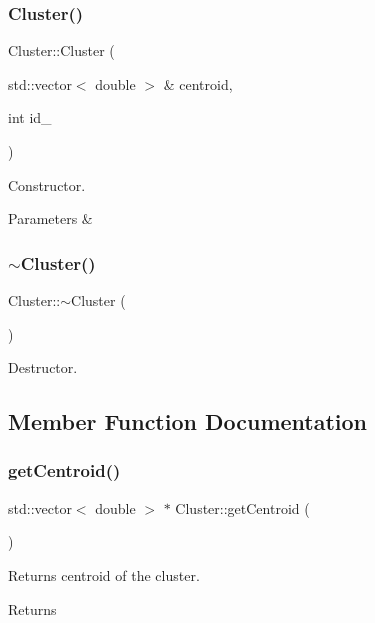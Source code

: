 \subsubsection{\texorpdfstring{Cluster()}{Cluster()}}
{\footnotesize\ttfamily Cluster\+::\+Cluster (\begin{DoxyParamCaption}\item[{std\+::vector$<$ double $>$ \&}]{centroid,  }\item[{int}]{id\+\_\+ }\end{DoxyParamCaption})}

Constructor. 
\begin{DoxyParams}{Parameters}
{\em } & \\
\hline
\end{DoxyParams}
\mbox{\label{class_cluster_a4bddfc88ac859610acab15dd12851b58}} 
\subsubsection{\texorpdfstring{$\sim$\+Cluster()}{~Cluster()}}
{\footnotesize\ttfamily Cluster\+::$\sim$\+Cluster (\begin{DoxyParamCaption}{ }\end{DoxyParamCaption})}

Destructor. 

\subsection{Member Function Documentation}
\mbox{\label{class_cluster_a6f53e148f46f17c27309d18645e60d5b}} 
\subsubsection{\texorpdfstring{get\+Centroid()}{getCentroid()}}
{\footnotesize\ttfamily std\+::vector$<$ double $>$ $\ast$ Cluster\+::get\+Centroid (\begin{DoxyParamCaption}{ }\end{DoxyParamCaption})}

Returns centroid of the cluster. \begin{DoxyReturn}{Returns}

\end{DoxyReturn}
\mbox{\label{class_cluster_a7e3843eaa486b9dd28de25a7c9f4e1f9}} 
